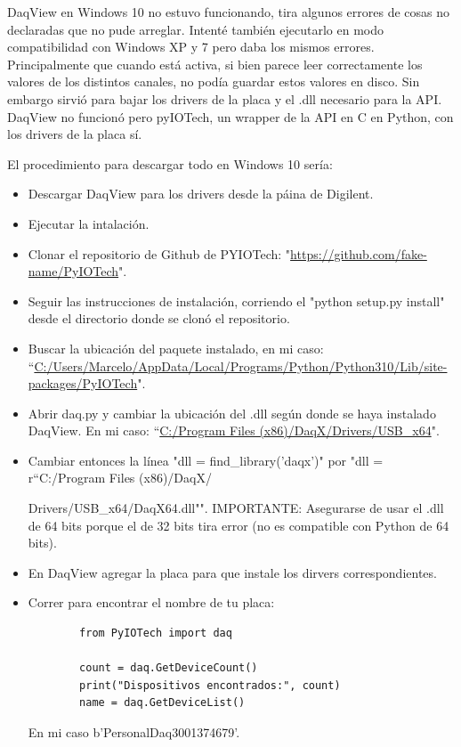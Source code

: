 DaqView en Windows 10 no estuvo funcionando, tira algunos errores de cosas no declaradas que no pude arreglar. Intenté también ejecutarlo en modo compatibilidad con Windows XP y 7 pero daba los mismos errores. Principalmente que cuando está activa, si bien parece leer correctamente los valores de los distintos canales, no podía guardar estos valores en disco. Sin embargo sirvió para bajar los drivers de la placa y el .dll necesario para la API. 
DaqView no funcionó pero pyIOTech, un wrapper de la API en C en Python, con los drivers de la placa sí.

El procedimiento para descargar todo en Windows 10 sería:
\begin{itemize}
	\item Descargar DaqView para los drivers desde la páina de Digilent. 
	\item Ejecutar la intalación.
	\item Clonar el repositorio de Github de PYIOTech: "\url{https://github.com/fake-name/PyIOTech}".
	\item Seguir las instrucciones de instalación, corriendo el "python setup.py install" desde el directorio donde se clonó el repositorio.
	\item Buscar la ubicación del paquete instalado, en mi caso: ``\url{C:/Users/Marcelo/AppData/Local/Programs/Python/Python310/Lib/site-packages/PyIOTech}". %
	\item Abrir daq.py y cambiar la ubicación del .dll según donde se haya instalado DaqView. En mi caso: ``\url{C:/Program Files (x86)/DaqX/Drivers/USB\_x64}". %
	\item Cambiar entonces la línea "dll = find\_library('daqx')" por "dll = r``C:/Program Files (x86)/DaqX/
	
	Drivers/USB\_x64/DaqX64.dll"". IMPORTANTE: Asegurarse de usar el .dll de 64 bits porque el de 32 bits tira error (no es compatible con Python de 64 bits). %
	\item En DaqView agregar la placa para que instale los dirvers correspondientes.
	\item Correr para encontrar el nombre de tu placa:
	\begin{lstlisting} 
		from PyIOTech import daq
		
		count = daq.GetDeviceCount()  
		print("Dispositivos encontrados:", count)
		name = daq.GetDeviceList()
	\end{lstlisting}
	En mi caso b'PersonalDaq3001{374679}'.
\end{itemize} %

